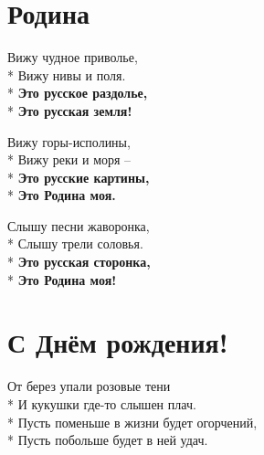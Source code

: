 \vspace{\fill}\newpage

\section{Родина}
\label{song:Родина}

\medskip

\begin{minipage}{\linewidth}
Вижу чудное приволье,\\*
Вижу нивы и поля.\\*
\textbf{Это русское раздолье,}\\*
\textbf{Это русская земля!}\\
\end{minipage}\par\medskip\nobreak

\medskip

\begin{minipage}{\linewidth}
Вижу горы-исполины,\\*
Вижу реки и моря –\\*
\textbf{Это русские картины,}\\*
\textbf{Это Родина моя.}\\
\end{minipage}\par\medskip\nobreak

\medskip

\begin{minipage}{\linewidth}
Слышу песни жаворонка,\\*
Слышу трели соловья.\\*
\textbf{Это русская сторонка,}\\*
\textbf{Это Родина моя! }\\
\end{minipage}

\vspace{\fill}\newpage

\section{С Днём рождения!}
\label{song:С_Днём_рождения!}

\medskip

\begin{minipage}{\linewidth}
От берез упали розовые тени\\*
И кукушки где-то слышен плач.\\*
Пусть поменьше в жизни будет огорчений,\\*
Пусть побольше будет в ней удач.\\
\end{minipage}\par\medskip\nobreak

